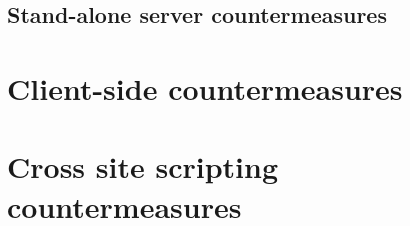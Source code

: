 
\subsection{Stand-alone server countermeasures}\label{standalone-server}

\section{Client-side countermeasures}

\section{Cross site scripting countermeasures}\label{xss-countermeasures}
